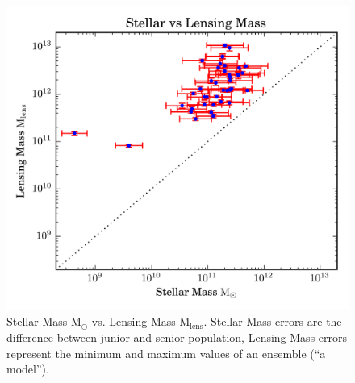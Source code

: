 \documentclass{ws-procs975x65}
\newcommand{\Mlens}{\ensuremath{\text{M}_\text{lens}}\xspace}
\newcommand{\Mstel}{\ensuremath{\text{M}_\odot}\xspace}
\begin{document}
\begin{figure}
\centering
\includegraphics[width=0.8\columnwidth]{img/plot}
\caption{Stellar Mass \Mstel vs. Lensing Mass \Mlens. Stellar Mass errors are the difference between junior and senior population, Lensing Mass errors represent the minimum and maximum values of an ensemble (``a model'').}
\label{fig:frac}
\end{figure}






\end{document}
